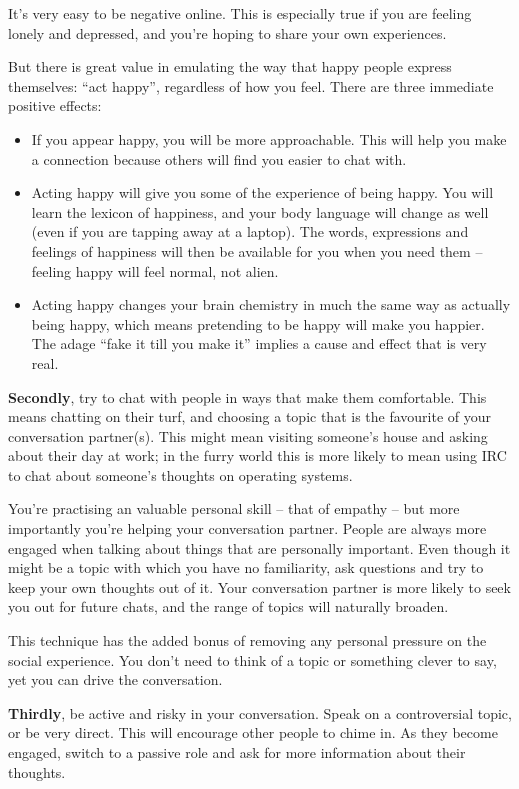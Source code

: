 It's very easy to be negative online. This is especially true if you are feeling lonely and depressed, and you're hoping to share your own experiences.

But there is great value in emulating the way that happy people express themselves: ``act happy'', regardless of how you feel. There are three immediate positive effects:

\begin{itemize}
  \item If you appear happy, you will be more approachable. This will help you make a connection because others will find you easier to chat with.
  \item Acting happy will give you some of the experience of being happy. You will learn the lexicon of happiness, and your body language will change as well (even if you are tapping away at a laptop). The words, expressions and feelings of happiness will then be available for you when you need them -- feeling happy will feel normal, not alien.
  \item Acting happy changes your brain chemistry in much the same way as actually being happy, which means pretending to be happy will make you happier. The adage ``fake it till you make it'' implies a cause and effect that is very real.
\end{itemize}

\textbf{Secondly}, try to chat with people in ways that make them comfortable. This means chatting on their turf, and choosing a topic that is the favourite of your conversation partner(s). This might mean visiting someone's house and asking about their day at work; in the furry world this is more likely to mean using IRC to chat about someone's thoughts on operating systems.

You're practising an valuable personal skill -- that of empathy -- but more importantly you're helping your conversation partner. People are always more engaged when talking about things that are personally important. Even though it might be a topic with which you have no familiarity, ask questions and try to keep your own thoughts out of it. Your conversation partner is more likely to seek you out for future chats, and the range of topics will naturally broaden.

This technique has the added bonus of removing any personal pressure on the social experience. You don't need to think of a topic or something clever to say, yet you can drive the conversation.

\textbf{Thirdly}, be active and risky in your conversation. Speak on a controversial topic, or be very direct. This will encourage other people to chime in. As they become engaged, switch to a passive role and ask for more information about their thoughts.

